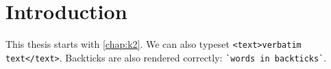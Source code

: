 \chapter{Introduction}

This thesis starts with \cref{chap:k2}.
We can also typeset \verb|<text>verbatim text</text>|.
Backticks are also rendered correctly: \verb|`words in backticks`|.


